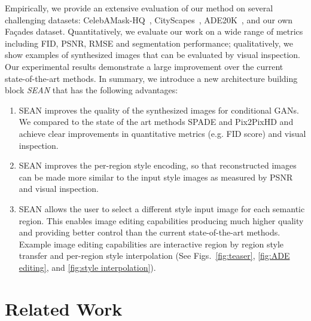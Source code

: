 \documentclass[10pt,twocolumn,letterpaper]{article}
\def\Facades{Fa\c{c}ades\xspace}
\begin{document}
Empirically, we provide an extensive evaluation of our method on several challenging datasets: CelebAMask-HQ~\cite{CelebAMask-HQ,karras2017progressive,liu2015faceattributes}, 
CityScapes~\cite{Cordts2016Cityscapes}, ADE20K~\cite{zhou2017scene}, and our own \Facades dataset. 
Quantitatively, we evaluate our work on a wide range of metrics including FID, PSNR, RMSE and segmentation performance; qualitatively, we show examples of synthesized images that can be evaluated by visual inspection. 
Our experimental results demonstrate a large improvement over the current state-of-the-art methods. In summary, we introduce a new architecture building block \emph{SEAN} that has the following advantages:
\begin{enumerate}
  \item SEAN improves the quality of the synthesized images for conditional GANs. We compared to the state of the art methods SPADE and Pix2PixHD and achieve clear improvements in quantitative metrics (e.g. FID score) and visual inspection.
  \item SEAN improves the per-region style encoding, so that reconstructed images can be made more similar to the input style images as measured by PSNR and visual inspection.
  \item SEAN allows the user to select a different style input image for each semantic region. This enables image editing capabilities producing much higher quality and providing better control than the current state-of-the-art methods. Example image editing capabilities are interactive region by region style transfer and per-region style interpolation (See Figs.~\ref{fig:teaser}, \ref{fig:ADE editing}, and \ref{fig:style interpolation}).
\end{enumerate}



\section{Related Work}
\end{document}
